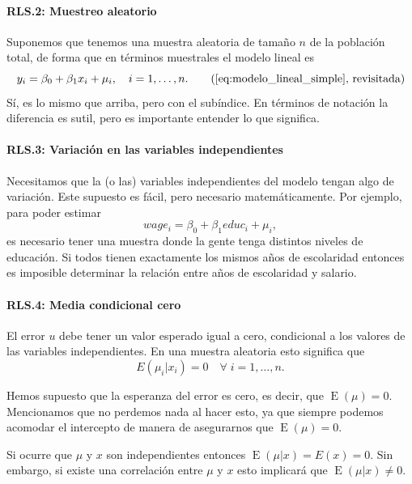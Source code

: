 \documentclass{report}\usepackage[]{graphicx}\usepackage[]{color}
\newcommand{\E}{\operatorname{E}}
\begin{document}
\paragraph{RLS.2: Muestreo aleatorio} Suponemos que tenemos una muestra aleatoria de tamaño $n$ de la población total, de forma que en términos muestrales el modelo lineal es
\begin{equation}
y_i = \beta_0 + \beta_1 x_i + \mu_i, \quad i = 1,\ldots,n. \tag{\ref{eq:modelo_lineal_simple}, revisitada}
\end{equation}
Sí, es lo mismo que arriba, pero con el subíndice. En términos de notación la diferencia es sutil, pero es importante entender lo que significa.

\paragraph{RLS.3: Variación en las variables independientes}
Necesitamos que la (o las) variables independientes del modelo tengan algo de variación.
Este supuesto es fácil, pero necesario matemáticamente.
Por ejemplo, para poder estimar
\begin{equation*}
wage_i = \beta_0 + \beta_1 educ_i + \mu_i,
\end{equation*}
es necesario tener una muestra donde la gente tenga distintos niveles de educación. Si todos tienen exactamente los mismos años de escolaridad entonces es imposible determinar la relación entre años de escolaridad y salario.

\paragraph{RLS.4: Media condicional cero}
El error $u$ debe tener un valor esperado igual a cero, condicional a los valores de las variables independientes. En una muestra aleatoria esto significa que
\begin{equation}
E(\mu_i | x_i) = 0 \quad \forall\; i = 1,\ldots, n.
\end{equation}

Hemos supuesto que la esperanza del error es cero, es decir, que $\E(\mu)=0$.
Mencionamos que no perdemos nada al hacer esto, ya que siempre podemos acomodar el intercepto de manera de asegurarnos que $\E(\mu)=0$.

Si ocurre que $\mu$ y $x$ son independientes entonces $\E(\mu | x) = E(x) = 0$.
Sin embargo, si existe una correlación entre $\mu$ y $x$ esto implicará que $\E(\mu | x) \neq 0$.
\end{document}
